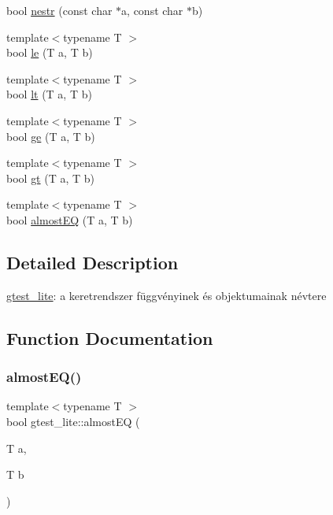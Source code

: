 \begin{DoxyCompactItemize}
bool \hyperlink{namespacegtest__lite_a0a34b1bb0d55bc0c6a3e878ec2bcd49f}{nestr} (const char $\ast$a, const char $\ast$b)
\item 
{\footnotesize template$<$typename T $>$ }\\bool \hyperlink{namespacegtest__lite_a92068d494867b61abeef5942eefac3a3}{le} (T a, T b)
\item 
{\footnotesize template$<$typename T $>$ }\\bool \hyperlink{namespacegtest__lite_acfefb55c5d3713c79b659bbd18d9423c}{lt} (T a, T b)
\item 
{\footnotesize template$<$typename T $>$ }\\bool \hyperlink{namespacegtest__lite_ae8c2517b99b688c6136d8c7c18551da5}{ge} (T a, T b)
\item 
{\footnotesize template$<$typename T $>$ }\\bool \hyperlink{namespacegtest__lite_a2075d101da98f80f569b0737c5185718}{gt} (T a, T b)
\item 
{\footnotesize template$<$typename T $>$ }\\bool \hyperlink{namespacegtest__lite_affbf9748c4e4dec6db137f7c147fee61}{almost\+EQ} (T a, T b)
\end{DoxyCompactItemize}


\subsection{Detailed Description}
\hyperlink{namespacegtest__lite}{gtest\+\_\+lite}\+: a keretrendszer függvényinek és objektumainak névtere 

\subsection{Function Documentation}
\mbox{\label{namespacegtest__lite_affbf9748c4e4dec6db137f7c147fee61}} 
\subsubsection{\texorpdfstring{almost\+E\+Q()}{almostEQ()}}
{\footnotesize\ttfamily template$<$typename T $>$ \\
bool gtest\+\_\+lite\+::almost\+EQ (\begin{DoxyParamCaption}\item[{T}]{a,  }\item[{T}]{b }\end{DoxyParamCaption})}

